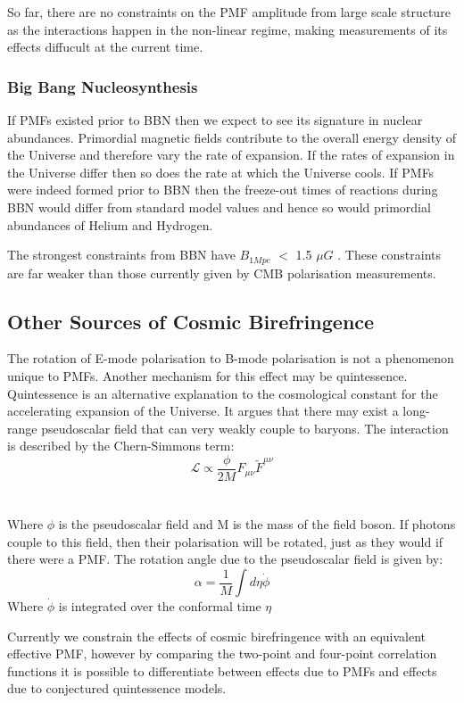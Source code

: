 So far, there are no constraints on the PMF amplitude from large scale structure as the interactions happen in the non-linear regime, making measurements of its effects diffucult at the current time.


\subsubsection*{Big Bang Nucleosynthesis}

If PMFs existed prior to BBN then we expect to see its signature in nuclear abundances. Primordial magnetic fields contribute to the overall energy density of the Universe and therefore vary the rate of expansion. If the rates of expansion in the Universe differ then so does the rate at which the Universe cools. If PMFs were indeed formed prior to BBN then the freeze-out times of reactions during BBN would differ from standard model values and hence so would primordial abundances of Helium and Hydrogen.

The strongest constraints from BBN have $B_{1Mpc}$ $<$ 1.5 $\mu G$ \cite{PhysRevD.86.063003}. These constraints are far weaker than those currently given by CMB polarisation measurements.

\subsection{Other Sources of Cosmic Birefringence}
The rotation of E-mode polarisation to B-mode polarisation is not a phenomenon unique to PMFs. Another mechanism for this effect may be quintessence. Quintessence is an alternative explanation to the cosmological constant for the accelerating expansion of the Universe. It argues that there may exist a long-range pseudoscalar field that can very weakly couple to baryons. The interaction is described by the Chern-Simmons term:
\begin{equation}
\mathcal{L} \propto \frac{\phi}{2M}F_{\mu \nu}\tilde{F}^{\mu \nu}
\end{equation}
\\\\
Where $\phi$ is the pseudoscalar field and M is the mass of the field boson. If photons couple to this field, then their polarisation will be rotated, just as they would if there were a PMF. The rotation angle due to the pseudoscalar field is given by:
\begin{equation}
\alpha = \frac{1}{M} \int{d\eta \dot{\phi}}
\end{equation}
Where $\dot{\phi}$ is integrated over the conformal time $\eta$

Currently we constrain the effects of cosmic birefringence with an equivalent effective PMF, however by comparing the two-point and four-point correlation functions it is possible to differentiate between effects due to PMFs and effects due to conjectured quintessence models. \cite{Ade:2015cao}




